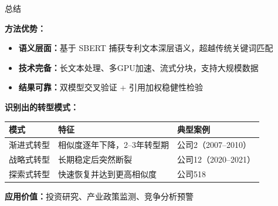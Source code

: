 \documentclass[aspectratio=169]{beamer}
\begin{document}
\begin{frame}{总结}

\textbf{方法优势：}
\begin{itemize}
    \item \textbf{语义层面：}基于 SBERT 捕获专利文本深层语义，超越传统关键词匹配
    \item \textbf{技术完备：}长文本处理、多GPU加速、流式分块，支持大规模数据
    \item \textbf{结果可靠：}双模型交叉验证 + 引用加权稳健性检验
\end{itemize}

\vspace{0.3cm}

\textbf{识别出的转型模式：}
\begin{center}
\begin{tabular}{lll}
\toprule
\textbf{模式} & \textbf{特征} & \textbf{典型案例} \\
\midrule
渐进式转型 & 相似度逐年下降，2--3年转型期 & 公司2（2007--2010） \\
战略式转型 & 长期稳定后突然断裂 & 公司12（2020--2021） \\
探索式转型 & 快速恢复并达到更高相似度 & 公司518 \\
\bottomrule
\end{tabular}
\end{center}

\vspace{0.3cm}

\textbf{应用价值：}投资研究、产业政策监测、竞争分析预警

\end{frame}
\end{document}
